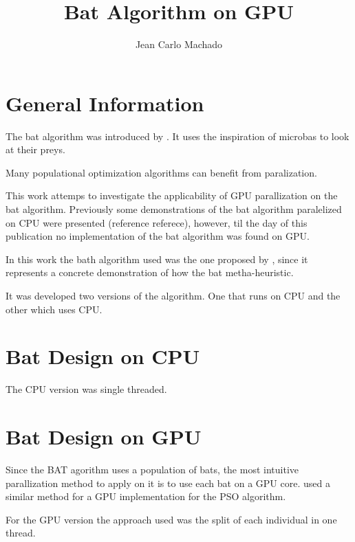 \documentclass[12pt]{article}
\title{Bat Algorithm on GPU}
\author{Jean Carlo Machado\inst{1}}
\begin{document}
\maketitle

\begin{abstract}
\end{abstract}

\begin{resumo}
\end{resumo}


\section{General Information}

The bat algorithm was introduced by \cite{original}. It uses the inspiration of microbas to look at their preys.

Many populational optimization algorithms can benefit from paralization.

This work attemps to investigate the applicability of GPU parallization
on the bat algorithm. Previously some demonstrations of the bat
algorithm paralelized on CPU were presented (reference referece),
however, til the day of this publication no implementation of the bat
algorithm was found on GPU.

In this work the bath algorithm used was the one proposed by
\cite{parpinelli}, since it represents a concrete demonstration of how
the bat metha-heuristic.

It was developed two versions of the algorithm. One that runs on CPU and
the other which uses CPU.

\section{Bat Design on CPU}

The CPU version was single threaded.

\section{Bat Design on GPU}

Since the BAT agorithm uses a population of bats, the most intuitive
parallization method to apply on it is to use each bat on a GPU core.
\cite{pso-gpu} used a similar method for a GPU implementation for the PSO algorithm.

For the GPU version the approach used was the split of each individual in one thread.
\end{document}

